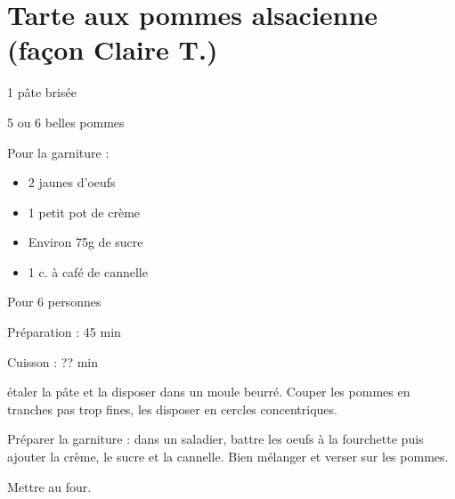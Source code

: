 
\section[\normalsize{Tarte aux pommes alsacienne (façon Claire T.)}]{Tarte aux pommes alsacienne (façon Claire T.)}


\begin{ingredients}
\item 1 p\^ate bris\'ee
\item 5 ou 6 belles pommes 
\item Pour la garniture :
\begin{itemize}
\item 2 jaunes d'oeufs
\item 1 petit pot de cr\`eme
\item Environ 75g de sucre
\item 1 c. \`a caf\'e de cannelle
\end{itemize}
\end{ingredients}
\begin{infos}
\item Pour 6 personnes
\item Préparation : 45 min
\item Cuisson : ?? min
\end{infos}
\begin{etapes}
\item \'etaler la p\^ate et la disposer dans un moule beurr\'e. Couper les pommes en tranches pas trop fines, les disposer en cercles concentriques.
\item Pr\'eparer la garniture : dans un saladier, battre les oeufs \`a la fourchette puis ajouter la cr\`eme, le sucre et la cannelle. Bien m\'elanger et verser sur les pommes.
\item Mettre au four.
\end{etapes}
\begin{conseils}
\end{conseils}
